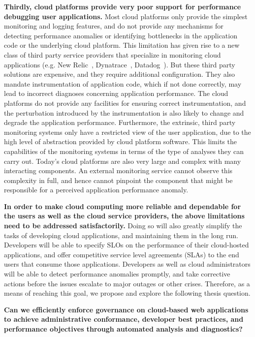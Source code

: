 \textbf{Thirdly, cloud platforms provide very poor support for performance debugging
user applications.} Most cloud platforms only provide the simplest monitoring and logging features,
and do not provide any mechanisms for detecting performance anomalies or identifying
bottlenecks in the application code or the underlying cloud platform. This limitation has given rise
to a new class of third party service providers that specialize in monitoring cloud applications
(e.g. New Relic~\cite{newrelic}, Dynatrace~\cite{dynatrace}, Datadog~\cite{datadog}). But these 
third party solutions are expensive, and they require additional configuration. 
They also mandate instrumentation of application code, which if not done
correctly, may lead to incorrect diagnoses concerning application performance. The cloud
platforms do not provide any facilities for ensuring correct instrumentation, and the perturbation
introduced by the instrumentation is also likely to change and degrade the application performance.
Furthermore, the extrinsic, third party monitoring systems only have a restricted view 
of the user application, due to the high level of abstraction provided by cloud platform software.
This limits the capabilities of the monitoring systems in terms of the type of analyses they can carry out.
Today's cloud platforms are also very large and complex with many interacting components.
An external monitoring service cannot observe this complexity in full, and hence cannot pinpoint
the component that might be responsible for a perceived application performance anomaly.

\textbf{In order to make cloud computing more reliable and dependable for the users as well
as the cloud service providers, the above limitations need to be addressed satisfactorily.}
Doing so will also greatly simplify the tasks of developing cloud applications, and maintaining 
them in the long run. Developers will be able to specify SLOs on the performance of
their cloud-hosted applications, and offer competitive service level agreements (SLAs) to the end users that consume those
applications. Developers as well as cloud administrators will be able to detect performance anomalies
promptly, and take corrective actions before the issues escalate to major
outages or other crises. Therefore, as a means of reaching this goal, we propose and explore the
following thesis question.

{\bf Can we efficiently enforce governance on cloud-based web applications to achieve 
administrative conformance, developer best practices, and performance objectives through 
automated analysis and diagnostics?} 

